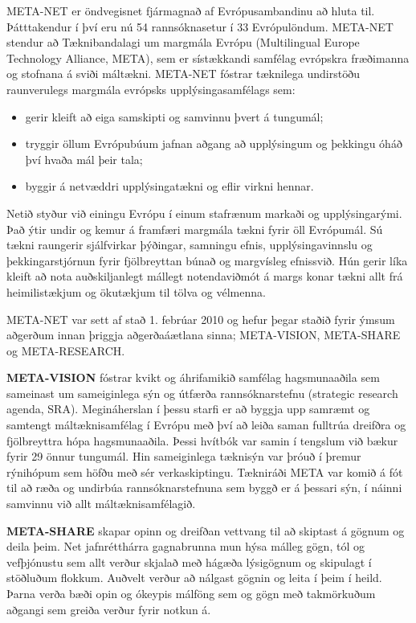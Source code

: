 \begin{multicols}{2}

META-NET er öndvegisnet fjármagnað af Evrópusambandinu að hluta til. Þátttakendur í því eru nú 54 rannsóknasetur í 33 Evrópulöndum. META-NET stendur að Tæknibandalagi um margmála Evrópu (Multilingual Europe Technology Alliance, META), sem er sístækkandi samfélag evrópskra fræðimanna og stofnana á sviði máltækni. META-NET fóstrar tæknilega undirstöðu raunverulegs margmála evrópsks upplýsingasamfélags sem:

\begin{itemize}
\item gerir kleift að eiga samskipti og samvinnu þvert á tungumál;
\item tryggir öllum Evrópubúum jafnan aðgang að upplýsingum og þekkingu óháð því hvaða mál þeir tala;
\item byggir á netvæddri upplýsingatækni og eflir virkni hennar. 
\end{itemize}

Netið styður við einingu Evrópu í einum stafrænum markaði og upplýsingarými. Það ýtir undir og kemur á framfæri margmála tækni fyrir öll Evrópumál. Sú tækni raungerir sjálfvirkar þýðingar, samningu efnis, upplýsingavinnslu og þekkingarstjórnun fyrir fjölbreyttan búnað og margvísleg efnissvið. Hún gerir líka kleift að nota auðskiljanlegt mállegt notendaviðmót á margs konar tækni allt frá heimilistækjum og ökutækjum til tölva og vélmenna.

META-NET var sett af stað 1. febrúar 2010 og hefur þegar staðið fyrir ýmsum aðgerðum innan þriggja aðgerðaáætlana sinna; META-VISION, META-SHARE og META-RESEARCH.

\textbf{META-VISION} fóstrar kvikt og áhrifamikið samfélag hagsmunaaðila sem sameinast um sameiginlega sýn og útfærða rannsóknarstefnu (strategic research agenda, SRA). Megináherslan í þessu starfi er að byggja upp samræmt og samtengt máltæknisamfélag í Evrópu með því að leiða saman fulltrúa dreifðra og fjölbreyttra hópa hagsmunaaðila. Þessi hvítbók var samin í tengslum við bækur fyrir 29 önnur tungumál. Hin sameiginlega tæknisýn var þróuð í þremur rýnihópum sem höfðu með sér verkaskiptingu. Tækniráði META var komið á fót til að ræða og undirbúa rannsóknarstefnuna sem byggð er á þessari sýn, í náinni samvinnu við allt máltæknisamfélagið.

\textbf{META-SHARE} skapar opinn og dreifðan vettvang til að skiptast á gögnum og deila þeim. Net jafnrétthárra gagnabrunna mun hýsa málleg gögn, tól og vefþjónustu sem allt verður skjalað með hágæða lýsigögnum og skipulagt í stöðluðum flokkum. Auðvelt verður að nálgast gögnin og leita í þeim í heild. Þarna verða bæði opin og ókeypis málföng sem og gögn með takmörkuðum aðgangi sem greiða verður fyrir notkun á. 


\end{multicols}

